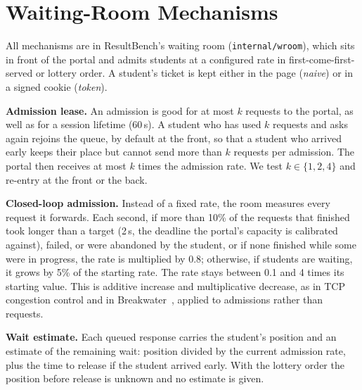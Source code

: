 \section{Waiting-Room Mechanisms}
\label{sec:design}

All mechanisms are in ResultBench's waiting room
(\texttt{internal/wroom}), which sits in front of the portal and admits
students at a configured rate in first-come-first-served or lottery order. A
student's ticket is kept either in the page (\emph{naive}) or in a signed
cookie (\emph{token}).

\textbf{Admission lease.} An admission is good for at most $k$ requests to
the portal, as well as for a session lifetime (60\,s). A student who has used
$k$ requests and asks again rejoins the queue, by default at the front, so
that a student who arrived early keeps their place but cannot send more than
$k$ requests per admission. The portal then receives at most $k$ times the
admission rate. We test $k \in \{1, 2, 4\}$ and re-entry at the front or the
back.

\textbf{Closed-loop admission.} Instead of a fixed rate, the room measures
every request it forwards. Each second, if more than 10\% of the requests that
finished took longer than a target (2\,s, the deadline the portal's
capacity is calibrated against), failed, or were abandoned by the
student, or if none finished while some were in progress, the rate is
multiplied by 0.8; otherwise, if students are waiting, it grows by 5\% of
the starting rate. The rate stays between 0.1 and 4 times its starting value.
This is additive increase and multiplicative decrease, as in TCP congestion
control and in Breakwater~\cite{cho2020breakwater}, applied to admissions
rather than requests.

\textbf{Wait estimate.} Each queued response carries the student's position
and an estimate of the remaining wait: position divided by the current
admission rate, plus the time to release if the student arrived early. With
the lottery order the position before release is unknown and no estimate is
given.

